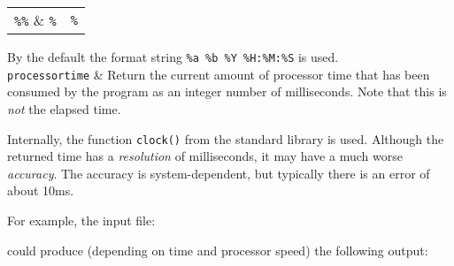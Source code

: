 \begin{desctab}
\begin{center}
\begin{tabular}{ll}
\verb'%%' & \verb'%' \\
\end{tabular}
\end{center}
\par
By the default the format string \verb'%a %b %Y %H:%M:%S' is used.
\\
{\tt processortime}
&
Return the current amount of processor time that has been consumed by the
program as an integer number of milliseconds. Note that this is {\em
not} the elapsed time.
\par
Internally, the function \verb'clock()' from the standard {\C} library is
used. Although the returned time has a {\em resolution} of milliseconds,
it may have a much worse {\em accuracy}. The accuracy is system-dependent,
but typically there is an error of about 10ms.
\\
\end{desctab}
\par
For example, the input file:
\begin{showfile}

\end{showfile}
could produce (depending on time and processor speed) the following output:
\begin{showfile}

\end{showfile}
